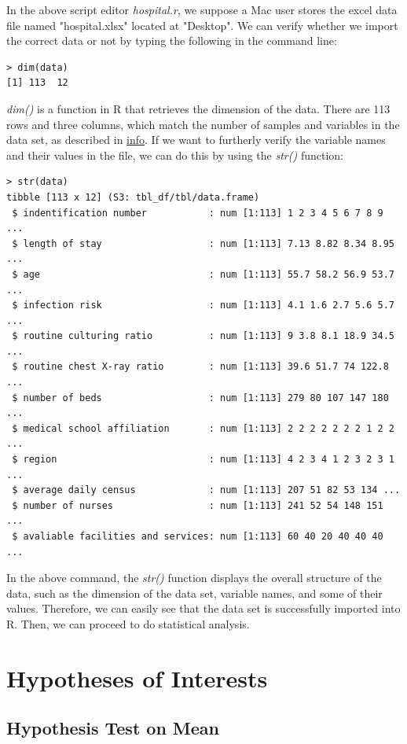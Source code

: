 \documentclass[11pt]{article}
\begin{document}
In the above script editor \textit{hospital.r}, we suppose a Mac user stores the excel data file named "hospital.xlsx" located at "Desktop". We can verify whether we import the correct data or not by typing the following in the command line:
\begin{commandline}
\begin{verbatim}
> dim(data)
[1] 113  12
\end{verbatim}
\end{commandline}
\textit{dim()} is a function in R that retrieves the dimension of the data. There are 113 rows and three columns, which match the number of samples and variables in the data set, as described in \hyperref[info]{info}. If we want to furtherly verify the variable names and their values in the file, we can do this by using the \textit{str()} function:
\begin{commandline}
\begin{verbatim}
> str(data)
tibble [113 x 12] (S3: tbl_df/tbl/data.frame)
 $ indentification number           : num [1:113] 1 2 3 4 5 6 7 8 9 ...
 $ length of stay                   : num [1:113] 7.13 8.82 8.34 8.95 ...
 $ age                              : num [1:113] 55.7 58.2 56.9 53.7 ...
 $ infection risk                   : num [1:113] 4.1 1.6 2.7 5.6 5.7 ...
 $ routine culturing ratio          : num [1:113] 9 3.8 8.1 18.9 34.5 ...
 $ routine chest X-ray ratio        : num [1:113] 39.6 51.7 74 122.8 ...
 $ number of beds                   : num [1:113] 279 80 107 147 180 ...
 $ medical school affiliation       : num [1:113] 2 2 2 2 2 2 2 1 2 2 ...
 $ region                           : num [1:113] 4 2 3 4 1 2 3 2 3 1 ...
 $ average daily census             : num [1:113] 207 51 82 53 134 ...
 $ number of nurses                 : num [1:113] 241 52 54 148 151 ...
 $ avaliable facilities and services: num [1:113] 60 40 20 40 40 40 ...
\end{verbatim}
\end{commandline}
In the above command, the \textit{str()} function displays the overall structure of the data, such as the dimension of the data set, variable names, and some of their values. Therefore, we can easily see that the data set is successfully imported into R. Then, we can proceed to do statistical analysis. 


\section{Hypotheses of Interests}
\subsection{Hypothesis Test on Mean}
\end{document}
